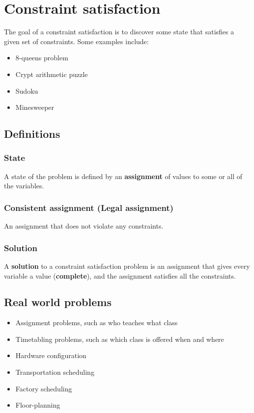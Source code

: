 \documentclass[11pt]{article}
\begin{document}
 \newpage
\section{Constraint satisfaction}
\label{sec:orgddc6c60}
The goal of a constraint satisfaction is to discover some state that satisfies a given set of constraints. Some examples include:
\begin{itemize}
\item 8-queens problem
\item Crypt arithmetic puzzle
\item Sudoku
\item Minesweeper
\end{itemize}
\subsection{Definitions}
\label{sec:org9f920e0}

\subsubsection{State}
\label{sec:org865d2ec}
A state of the problem is defined by an \textbf{assignment} of values to some or all of the variables.
\subsubsection{Consistent assignment (Legal assignment)}
\label{sec:org63cfe0a}
An assignment that does not violate any constraints.
\subsubsection{Solution}
\label{sec:orge0a628b}
A \textbf{solution} to a constraint satisfaction problem is an assignment that gives every variable a value (\textbf{complete}), and the assignment satisfies all the constraints.
\subsection{Real world problems}
\label{sec:org41ea34c}
\begin{itemize}
\item Assignment problems, such as who teaches what class
\item Timetabling problems, such as which class is offered when and where
\item Hardware configuration
\item Transportation scheduling
\item Factory scheduling
\item Floor-planning
\end{itemize}
\end{document}
